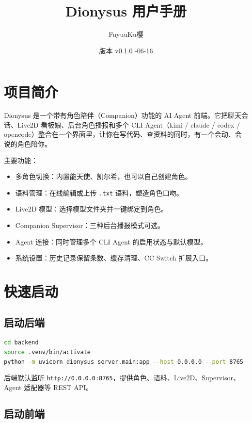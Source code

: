 \documentclass[12pt,a4paper]{article}
\title{Dionysus 用户手册}
\author{FuyuuKu樱}
\date{版本 v0.1.0 \quad 2026-06-16}
\begin{document}
\maketitle
\tableofcontents
\newpage

\section{项目简介}

Dionysus 是一个带有角色陪伴（Companion）功能的 AI Agent 前端。它把聊天会话、Live2D 看板娘、后台角色播报和多个 CLI Agent（kimi / claude / codex / opencode）整合在一个界面里，让你在写代码、查资料的同时，有一个会动、会说的角色陪你。

主要功能：

\begin{itemize}
  \item 多角色切换：内置能天使、凯尔希，也可以自己创建角色。
  \item 语料管理：在线编辑或上传 \texttt{.txt} 语料，塑造角色口吻。
  \item Live2D 模型：选择模型文件夹并一键绑定到角色。
  \item Companion Supervisor：三种后台播报模式可选。
  \item Agent 连接：同时管理多个 CLI Agent 的启用状态与默认模型。
  \item 系统设置：历史记录保留条数、缓存清理、CC Switch 扩展入口。
\end{itemize}

\section{快速启动}

\subsection{启动后端}

\begin{lstlisting}[language=bash]
cd backend
source .venv/bin/activate
python -m uvicorn dionysus_server.main:app --host 0.0.0.0 --port 8765
\end{lstlisting}

后端默认监听 \texttt{http://0.0.0.0:8765}，提供角色、语料、Live2D、Supervisor、Agent 适配器等 REST API。

\subsection{启动前端}
\end{document}
